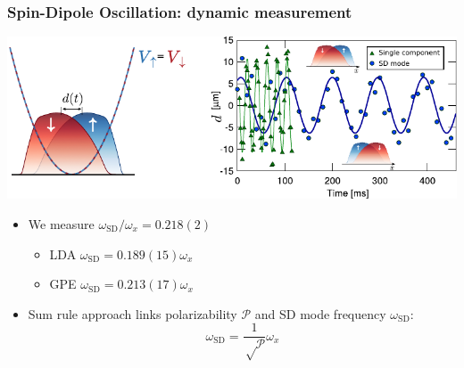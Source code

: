 \begin{frame}
\frametitle{Spin-Dipole Oscillation: dynamic measurement}

\centering
\includegraphics[width=0.95\linewidth]{Figures/SD_Oscillations2.pdf}

\begin{itemize}
\item We measure $\omega_{\text{SD}}/\omega_x = 0.218(2)$
	\begin{itemize}
	\item LDA $\omega_{\text{SD}} = 0.189(15) \omega_x$
	\item GPE $\omega_{\text{SD}} = 0.213(17) \omega_x$ 
	\end{itemize}
\item Sum rule approach links polarizability $\mathcal P$ and SD mode frequency $\omega_{\text{SD}}$: 
\begin{equation*}
\omega_{\text{SD}} = \frac{1}{\sqrt \mathcal P} \omega_x
\end{equation*}
\end{itemize}

\end{frame}

